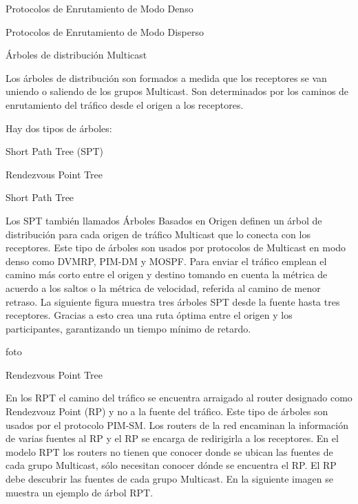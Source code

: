 \documentclass[12pt,a4paper,oneside]{book}
\begin{document}
\vspace{0.5cm}
Protocolos de Enrutamiento de Modo Denso

\vspace{0.5cm}
Protocolos de Enrutamiento de Modo Disperso

\vspace{0.5cm}

Árboles de distribución Multicast

\vspace{0.5cm}

Los árboles de distribución son formados a medida que los receptores se van uniendo o saliendo de los grupos Multicast. Son determinados por los caminos de enrutamiento del tráfico desde el origen a los receptores. 

\vspace{0.5cm}

Hay dos tipos de árboles:

\vspace{0.5cm}

Short Path Tree (SPT)

\vspace{0.5cm}

Rendezvous Point Tree


\vspace{0.5cm}

Short Path Tree

\vspace{0.5cm}

Los SPT también llamados Árboles Basados en Origen definen un árbol de distribución para cada origen de tráfico Multicast que lo conecta con los receptores. Este tipo de árboles son usados por protocolos de Multicast en modo denso como DVMRP, PIM-DM y MOSPF. Para enviar el tráfico emplean el camino más corto entre el origen y destino tomando en cuenta la métrica de acuerdo a los saltos o la métrica de velocidad, referida al camino de menor retraso. La siguiente figura muestra tres árboles SPT desde la fuente hasta tres receptores. Gracias a esto crea una ruta óptima entre el origen y los participantes, garantizando un tiempo mínimo de retardo.

foto

Rendezvous Point Tree	

\vspace{0.5cm}

En los RPT el camino del tráfico se encuentra arraigado al router designado como Rendezvouz Point (RP) y no a la fuente del tráfico. Este tipo de árboles son usados por el protocolo PIM-SM. Los routers de la red encaminan la información de varias fuentes al RP y el RP se encarga de redirigirla a los receptores. En el modelo RPT los routers no tienen que conocer donde se ubican las fuentes de cada grupo Multicast, sólo necesitan conocer dónde se encuentra el RP. El RP debe descubrir las fuentes de cada grupo Multicast. En la siguiente imagen se muestra un ejemplo de árbol RPT.
\end{document}
